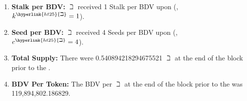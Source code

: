 \documentclass[class=article, crop=false]{standalone}
\begin{document}
\begin{enumerate}
        \item \textbf{Stalk per BDV:} \hyperlink{ht25}{$\beth$}  received 1 Stalk per BDV upon  (, $k^{\hyperlink{ht25}{\beth}} = 1$).
        \item \textbf{Seed per BDV:} \hyperlink{ht25}{$\beth$}  received 4 Seeds per BDV upon  (, $c^{\hyperlink{ht25}{\beth}} = 4$).
        \item \textbf{Total Supply:} There were 0.540894218294675521 \hyperlink{ht25}{$\beth$} at the end of the block prior to the .
        \item \textbf{BDV Per Token:} The BDV per \hyperlink{ht25}{$\beth$} at the end of the block prior to the  was 119,894,802.186829.
    \end{enumerate}

\newpage
\end{document}
